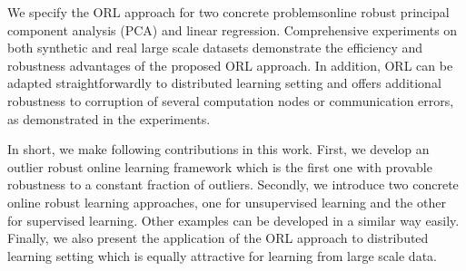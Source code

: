 \documentclass[11pt]{article}
\begin{document}



We specify  the  ORL approach for two concrete problems\textemdash online robust principal component analysis (PCA) and  linear regression. Comprehensive experiments on both synthetic and real large scale datasets  demonstrate the efficiency and robustness advantages of the proposed ORL approach. In addition, ORL can be adapted straightforwardly to distributed learning setting and offers additional robustness to corruption of several computation nodes or communication errors, as demonstrated in the experiments.

In short, we make following contributions in this work. First, we develop an outlier robust online learning framework which is the first one with provable robustness to a constant fraction of outliers. Secondly, we introduce two concrete online robust learning approaches, one for unsupervised learning and the other for supervised learning. Other examples can be developed in a similar way easily.  Finally, we also present the  application of the ORL approach to distributed learning setting which is equally attractive for learning from large scale data. 
\end{document}
